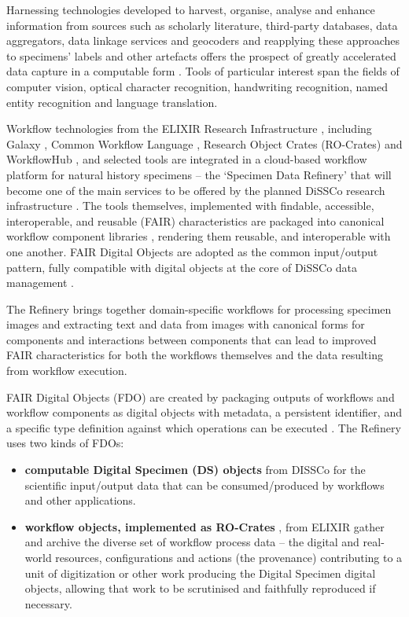 Harnessing technologies developed to harvest, organise, analyse and
enhance information from sources such as scholarly literature,
third-party databases, data aggregators, data linkage services and
geocoders and reapplying these approaches to specimens' labels and other
artefacts offers the prospect of greatly accelerated data capture in a
computable form \cite{ch8-18}. Tools of particular interest span the fields
of computer vision, optical character recognition, handwriting
recognition, named entity recognition and language translation.

Workflow technologies from the ELIXIR Research Infrastructure \cite{ch8-19},
including Galaxy \cite{Afgan 2018}, Common Workflow Language \cite{Crusoe 2022}, Research
Object Crates (RO-Crates) \cite{OCarragain 2019,Soiland-Reyes 2022} and WorkflowHub \cite{Goble 2021}, and
selected tools are integrated in a cloud-based workflow platform for
natural history specimens -- the `Specimen Data Refinery' \cite{Walton 2020} that
will become one of the main services to be offered by the planned DiSSCo
research infrastructure \cite{ch8-5}. The tools themselves, implemented with
findable, accessible, interoperable, and reusable (FAIR) characteristics
\cite{Wilkinson 2016} are packaged into canonical workflow component libraries
\cite{ch8-27}, rendering them reusable, and interoperable with one another.
FAIR Digital Objects are adopted as the common input/output pattern,
fully compatible with digital objects at the core of DiSSCo data
management \cite{ch8-28}.

The Refinery brings together domain-specific workflows for processing
specimen images and extracting text and data from images with canonical
forms for components and interactions between components that can lead
to improved FAIR characteristics for both the workflows themselves and
the data resulting from workflow execution.

FAIR Digital Objects (FDO) are created by packaging outputs of workflows
and workflow components as digital objects with metadata, a persistent
identifier, and a specific type definition against which operations can
be executed \cite{De Smedt 2020}. The Refinery uses two kinds of FDOs:

\begin{itemize}
\item
  \textbf{computable Digital Specimen (DS) objects} \cite{ch8-30} from DISSCo
  for the scientific input/output data that can be consumed/produced by
  workflows and other applications.
\item
  \textbf{workflow objects, implemented as RO-Crates} \cite{Soiland-Reyes 2022}, from
  ELIXIR gather and archive the diverse set of workflow process data --
  the digital and real-world resources, configurations and actions (the
  provenance) contributing to a unit of digitization or other work
  producing the Digital Specimen digital objects, allowing that work to
  be scrutinised and faithfully reproduced if necessary.
\end{itemize}


